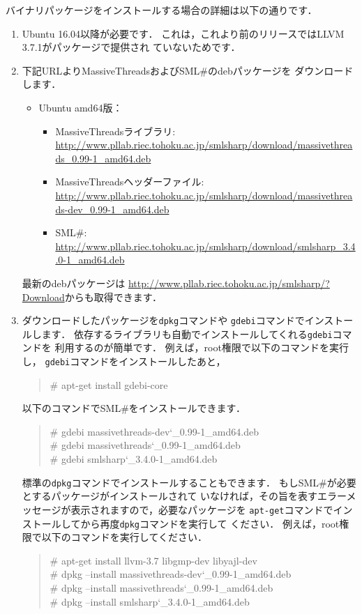 \documentclass{jbook}
\newcommand{\smlsharp}{SML\#}
\newcommand{\version}{3.4.0}
\newcommand\eurl[1]{{\edef\eurlTMP{{#1}}\expandafter\url\eurlTMP}}
\newenvironment{program}{\begin{quote}\begin{tt}}%
                        {\end{tt}\end{quote}}
\begin{document}
	バイナリパッケージをインストールする場合の詳細は以下の通りです．
\begin{enumerate}
\item
	Ubuntu 16.04以降が必要です．
	これは，これより前のリリースではLLVM 3.7.1がパッケージで提供され
ていないためです．

\item
	下記URLよりMassiveThreadsおよび\smlsharp{}のdebパッケージを
ダウンロードします．
\begin{itemize}
\item Ubuntu amd64版：
\begin{itemize}
\item MassiveThreadsライブラリ: \eurl{http://www.pllab.riec.tohoku.ac.jp/smlsharp/download/massivethreads_0.99-1_amd64.deb}
\item MassiveThreadsヘッダーファイル: \eurl{http://www.pllab.riec.tohoku.ac.jp/smlsharp/download/massivethreads-dev_0.99-1_amd64.deb}
\item \smlsharp{}: \eurl{http://www.pllab.riec.tohoku.ac.jp/smlsharp/download/smlsharp_\version-1_amd64.deb}
\end{itemize}
\end{itemize}
	最新のdebパッケージは
\url{http://www.pllab.riec.tohoku.ac.jp/smlsharp/?Download}からも取得できます．
\item
	ダウンロードしたパッケージを{\tt dpkg}コマンドや
{\tt gdebi}コマンドでインストールします．
	依存するライブラリも自動でインストールしてくれる{\tt gdebi}コマンドを
利用するのが簡単です．
	例えば，root権限で以下のコマンドを実行し，
{\tt gdebi}コマンドをインストールしたあと，
\begin{program}
\# apt-get install gdebi-core
\end{program}
	以下のコマンドで\smlsharp{}をインストールできます．
\begin{program}
\# gdebi massivethreads-dev\char`\_0.99-1\_amd64.deb\\
\# gdebi massivethreads\char`\_0.99-1\_amd64.deb\\
\# gdebi smlsharp\char`\_\version{}-1\_amd64.deb
\end{program}

	標準の{\tt dpkg}コマンドでインストールすることもできます．
	もし\smlsharp{}が必要とするパッケージがインストールされて
いなければ，その旨を表すエラーメッセージが表示されますので，必要なパッケージを
{\tt apt-get}コマンドでインストールしてから再度{\tt dpkg}コマンドを実行して
ください．
	例えば，root権限で以下のコマンドを実行してください．
\begin{program}
\# apt-get install llvm-3.7 libgmp-dev libyajl-dev\\
\# dpkg --install massivethreads-dev\char`\_0.99-1\_amd64.deb\\
\# dpkg --install massivethreads\char`\_0.99-1\_amd64.deb\\
\# dpkg --install smlsharp\char`\_\version{}-1\_amd64.deb
\end{program}
\end{enumerate}
\end{document}
